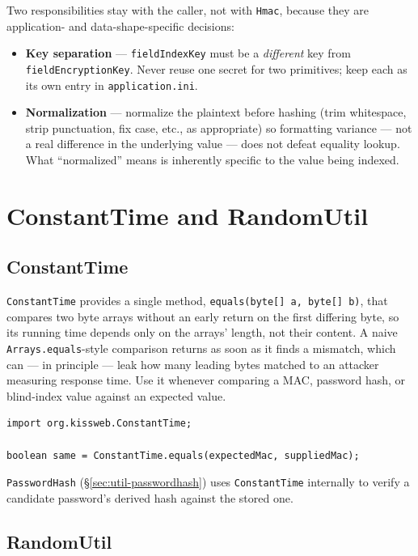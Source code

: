 \noindent
Two responsibilities stay with the caller, not with \texttt{Hmac}, because they are application- and data-shape-specific decisions:

\begin{itemize}
  \item \textbf{Key separation} --- \texttt{fieldIndexKey} must be a \emph{different} key from \texttt{fieldEncryptionKey}.  Never reuse one secret for two primitives; keep each as its own entry in \texttt{application.ini}.
  \item \textbf{Normalization} --- normalize the plaintext before hashing (trim whitespace, strip punctuation, fix case, etc., as appropriate) so formatting variance --- not a real difference in the underlying value --- does not defeat equality lookup.  What ``normalized'' means is inherently specific to the value being indexed.
\end{itemize}

\section{ConstantTime and RandomUtil}
\label{sec:util-constanttime}

\subsection{ConstantTime}

\texttt{ConstantTime} provides a single method, \texttt{equals(byte[] a, byte[] b)}, that compares two byte arrays without an early return on the first differing byte, so its running time depends only on the arrays' length, not their content.  A naive \texttt{Arrays.equals}-style comparison returns as soon as it finds a mismatch, which can --- in principle --- leak how many leading bytes matched to an attacker measuring response time.  Use it whenever comparing a MAC, password hash, or blind-index value against an expected value.

\begin{lstlisting}[style=java]
import org.kissweb.ConstantTime;

boolean same = ConstantTime.equals(expectedMac, suppliedMac);
\end{lstlisting}

\noindent
\texttt{PasswordHash} (\S\ref{sec:util-passwordhash}) uses \texttt{ConstantTime} internally to verify a candidate password's derived hash against the stored one.

\subsection{RandomUtil}

